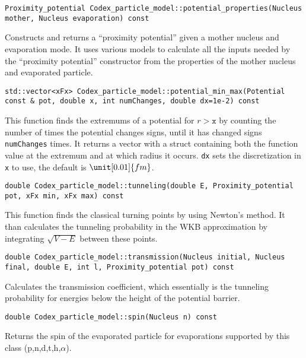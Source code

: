\begin{lstlisting}
Proximity_potential Codex_particle_model::potential_properties(Nucleus mother, Nucleus evaporation) const
\end{lstlisting}
Constructs and returns a ``proximity potential'' given a mother nucleus and evaporation mode. It uses various models to calculate all the inputs needed by the ``proximity potential'' constructor from the properties of the mother nucleus and evaporated particle.

\begin{lstlisting}
std::vector<xFx> Codex_particle_model::potential_min_max(Potential const & pot, double x, int numChanges, double dx=1e-2) const
\end{lstlisting}
This function finds the extremums of a potential for $r>\texttt{x}$ by counting the number of times the potential changes signs, until it has changed signs \texttt{numChanges} times. It returns a vector with a struct containing both the function value at the extremum and at which radius it occurs. \texttt{dx} sets the discretization in \texttt{x} to use, the default is $\unit[0.01]{fm}$.

\begin{lstlisting}
double Codex_particle_model::tunneling(double E, Proximity_potential pot, xFx min, xFx max) const
\end{lstlisting}
This function finds the classical turning points by using Newton's method. It than calculates the tunneling probability in the WKB approximation by integrating $\sqrt{V-E}$ between these points.

\begin{lstlisting}
double Codex_particle_model::transmission(Nucleus initial, Nucleus final, double E, int l, Proximity_potential pot) const
\end{lstlisting}
Calculates the transmission coefficient, which essentially is the tunneling probability for energies below the height of the potential barrier.

\begin{lstlisting}
double Codex_particle_model::spin(Nucleus n) const
\end{lstlisting}
Returns the spin of the evaporated particle for evaporations supported by this class (p,n,d,t,h,$\alpha$).

